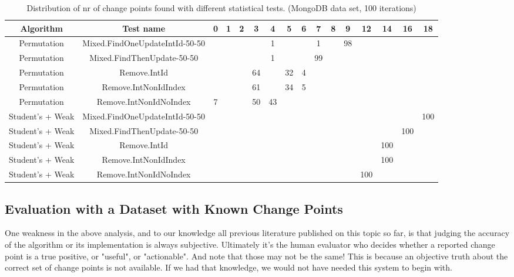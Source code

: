 \documentclass[sigconf]{acmart}
\begin{document}
\begin{table}
\caption{Distribution of nr of change points found with different statistical tests. (MongoDB data set, 100 iterations)}
\centering
\begin{tabular}{|c | c | c | c|c | c | c | c|c | c | c | c|c | c | c | c|}
\hline
Algorithm & Test name & 0 & 1 & 2 & 3 & 4 & 5 & 6 & 7 & 8 & 9 & 12 & 14 & 16 & 18 \\
\hline
Permutation & Mixed.FindOneUpdateIntId-50-50 & & & & & 1 & & & 1 & & 98 & & & &  \\
Permutation & Mixed.FindThenUpdate-50-50 & & & & & 1 & & & 99 & & & & & & \\
Permutation & Remove.IntId & & & & 64 & & 32 & 4 & & & & & & & \\
Permutation & Remove.IntNonIdIndex & & & & 61 & & 34 & 5 & & & & & & &\\
Permutation & Remove.IntNonIdNoIndex & 7 & & & 50 & 43 & & & & & & & & & \\
\hline
Student's + Weak & Mixed.FindOneUpdateIntId-50-50 & & & & & & & & & & & & & & 100 \\
Student's + Weak & Mixed.FindThenUpdate-50-50 & & & & & & & & & & & & & 100 & \\
Student's + Weak & Remove.IntId & & & & & & & & & & & & 100 & &  \\
Student's + Weak & Remove.IntNonIdIndex & & & & & & & & & & & & 100 & &  \\
Student's + Weak & Remove.IntNonIdNoIndex & & & & & & & & & & & 100 & & & \\
\hline
\end{tabular}
\end{table}

\subsection{Evaluation with a Dataset with Known Change Points}

One weakness in the above analysis, and to our knowledge all previous literature published on this
topic so far, is that judging the accuracy of the algorithm or its implementation is always subjective.
Ultimately it's the human evaluator who decides whether a reported change point is a true positive,
or "useful", or "actionable". And note that those may not be the same! This is because an objective
truth about the correct set of change points is not available. If we had that knowledge, we would
not have needed this system to begin with.
\end{document}
